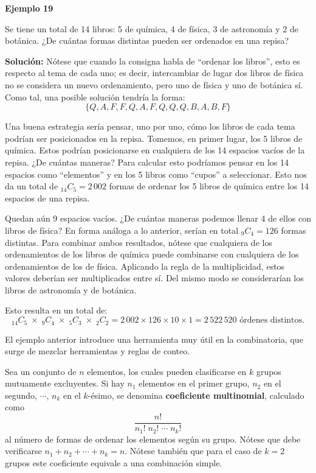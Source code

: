 \documentclass[
  letterpaper,
  DIV=11,
  numbers=noendperiod]{scrreprt}
\begin{document}
\begin{examplebox}

\begin{center}
\textbf{Ejemplo 19}

\end{center}

Se tiene un total de 14 libros: 5 de química, 4 de física, 3 de
astronomía y 2 de botánica. ¿De cuántas formas distintas pueden ser
ordenados en una repisa?

\textbf{Solución:} Nótese que cuando la consigna habla de ``ordenar los
libros'', esto es respecto al tema de cada uno; es decir, intercambiar
de lugar dos libros de física no se considera un nuevo ordenamiento,
pero uno de física y uno de botánica sí. Como tal, una posible solución
tendría la forma: \[\{Q,A,F,F,Q,A,F,Q,Q,Q,B,A,B,F\}\]

Una buena estrategia sería pensar, uno por uno, cómo los libros de cada
tema podrían ser posicionados en la repisa. Tomemos, en primer lugar,
los 5 libros de química. Estos podrían posicionarse en cualquiera de los
14 espacios vacíos de la repisa. ¿De cuántas maneras? Para calcular esto
podríamos pensar en los 14 espacios como ``elementos'' y en los 5 libros
como ``cupos'' a seleccionar. Esto nos da un total de
\(_{14}C_5 = 2\,002\) formas de ordenar los 5 libros de química entre
los 14 espacios de una repisa.

Quedan aún 9 espacios vacíos. ¿De cuántas maneras podemos llenar 4 de
ellos con libros de física? En forma análoga a lo anterior, serían en
total \(_9C_4 = 126\) formas distintas. Para combinar ambos resultados,
nótese que cualquiera de los ordenamientos de los libros de química
puede combinarse con cualquiera de los ordenamientos de los de física.
Aplicando la regla de la multiplicidad, estos valores deberían ser
multiplicados entre sí. Del mismo modo se considerarían los libros de
astronomía y de botánica.

Esto resulta en un total de:
\[_{14}C_5 \;\times\; _9C_4 \;\times\; _5C_3 \;\times\; _2C_2 = 2\,002 \times 126 \times 10 \times 1 = 2\,522\,520 \text{ órdenes distintos.}\]

\end{examplebox}

El ejemplo anterior introduce una herramienta muy útil en la
combinatoria, que surge de mezclar herramientas y reglas de conteo.

Sea un conjunto de \(n\) elementos, los cuales pueden clasificarse en
\(k\) grupos mutuamente excluyentes. Si hay \(n_1\) elementos en el
primer grupo, \(n_2\) en el segundo, \(\cdots\), \(n_k\) en el
\(k\)-ésimo, se denomina \textbf{coeficiente multinomial}, calculado
como \[\dfrac{n!}{n_1! \; n_2! \; \cdots \; n_k!}\] al número de formas
de ordenar los elementos según su grupo. Nótese que debe verificarse
\(n_1+n_2+\cdots+n_k=n\). Nótese también que para el caso de \(k=2\)
grupos este coeficiente equivale a una combinación simple.
\end{document}
